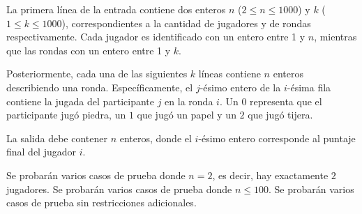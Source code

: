 \documentclass{oci}
\begin{document}
\begin{inputDescription}
  La primera línea de la entrada contiene dos enteros $n$ ($2 \leq n \leq 1000$)
  y $k$ ($1 \leq k \leq 1000$), correspondientes a la cantidad de jugadores y de
  rondas respectivamente.
  Cada jugador es identificado con un entero entre 1 y $n$, mientras que las rondas
  con un entero entre 1 y $k$.

  Posteriormente, cada una de las siguientes $k$ líneas contiene $n$ enteros describiendo
  una ronda.  Específicamente, el $j$-ésimo entero de la $i$-ésima fila contiene la jugada
  del participante $j$ en la ronda $i$.
  Un $0$ representa que el participante jugó piedra, un $1$ que jugó un papel y un $2$
  que jugó tijera.
\end{inputDescription}

\begin{outputDescription}
  La salida debe contener $n$ enteros, donde el $i$-ésimo entero corresponde al
  puntaje final del jugador $i$.
\end{outputDescription}

\begin{scoreDescription}
   Se probarán varios casos de prueba donde $n = 2$, es decir, hay exactamente $2$ jugadores.
   Se probarán varios casos de prueba donde $n \leq 100$.
   Se probarán varios casos de prueba sin restricciones adicionales.
\end{scoreDescription}

\begin{sampleDescription}
\end{sampleDescription}
\end{document}
